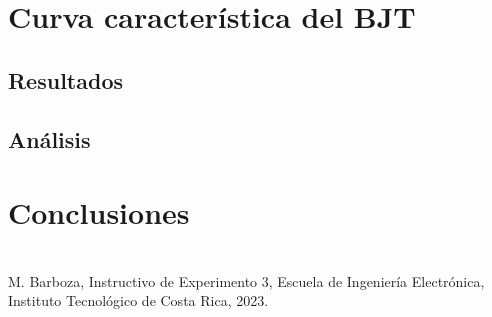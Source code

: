 \documentclass[journal]{IEEEtran}
\begin{document}

\section{Curva característica del BJT}
\subsection{Resultados}
\subsection{Análisis}


\section{Conclusiones}


\appendices
\section{}



\begin{thebibliography}{00}
 M. Barboza, Instructivo de Experimento 3,  Escuela de Ingeniería Electrónica, Instituto Tecnológico de Costa Rica, 2023.
\end{thebibliography}

\vfill
\end{document}
